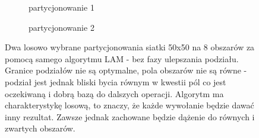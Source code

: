 \begin{figure}[h]
\centering
\begin{subfigure}{.5\textwidth}
    \centering
    \caption[short]{partycjonowanie 1}
\end{subfigure}%
\begin{subfigure}{.5\textwidth}
    \centering
    \caption[short]{partycjonowanie 2}
\end{subfigure}
\caption{Dwa losowo wybrane partycjonowania siatki 50x50 na 8 obszarów za pomocą samego algorytmu LAM - bez fazy ulepszania podziału.
    Granice podziałów nie są optymalne, pola obszarów nie są równe - podział jest jednak bliski bycia równym w kwestii pól co jest
    oczekiwaną i dobrą bazą do dalszych operacji. Algorytm ma charakterystykę losową, to znaczy, że każde wywołanie
    będzie dawać inny rezultat. Zawsze jednak zachowane będzie dążenie do równych i zwartych obszarów.}
\label{im:lam2}
\end{figure}

